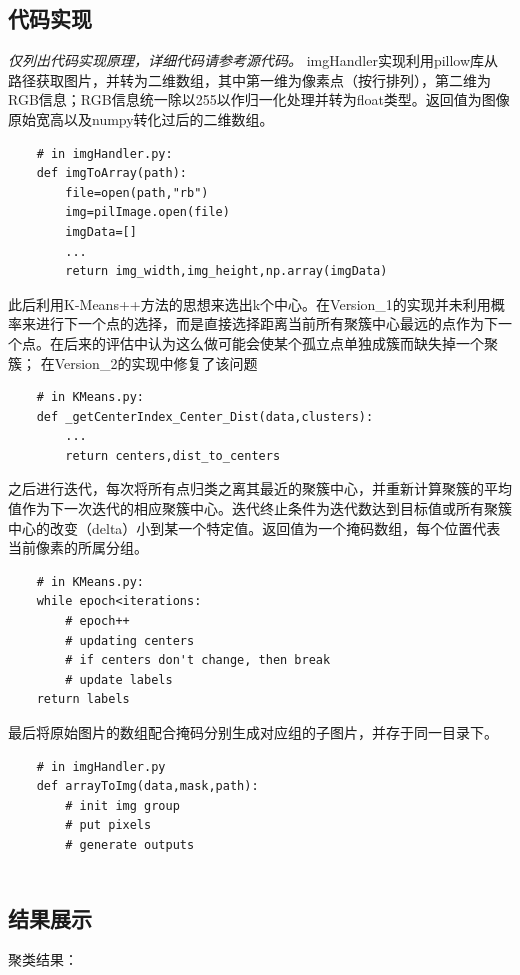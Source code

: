 \documentclass{article}
\begin{document}
\subsection{代码实现}
\textit{仅列出代码实现原理，详细代码请参考源代码。}
\lstset{
    language=python,
    frame=shadowbox,
    breaklines=true
}
imgHandler实现利用pillow库从路径获取图片，并转为二维数组，其中第一维为像素点（按行排列），第二维为RGB信息；RGB信息统一除以255以作归一化处理并转为float类型。返回值为图像原始宽高以及numpy转化过后的二维数组。
\begin{lstlisting}
    # in imgHandler.py:
    def imgToArray(path):
        file=open(path,"rb")
        img=pilImage.open(file)
        imgData=[]
        ...
        return img_width,img_height,np.array(imgData)
\end{lstlisting}
此后利用K-Means++方法的思想来选出k个中心。在Version_1的实现并未利用概率来进行下一个点的选择，而是直接选择距离当前所有聚簇中心最远的点作为下一个点。在后来的评估中认为这么做可能会使某个孤立点单独成簇而缺失掉一个聚簇；
在Version_2的实现中修复了该问题
\begin{lstlisting}
    # in KMeans.py:
    def _getCenterIndex_Center_Dist(data,clusters):
        ...
        return centers,dist_to_centers
\end{lstlisting}
之后进行迭代，每次将所有点归类之离其最近的聚簇中心，并重新计算聚簇的平均值作为下一次迭代的相应聚簇中心。迭代终止条件为迭代数达到目标值或所有聚簇中心的改变（delta）小到某一个特定值。返回值为一个掩码数组，每个位置代表当前像素的所属分组。
\begin{lstlisting}
    # in KMeans.py:
    while epoch<iterations:
        # epoch++
        # updating centers
        # if centers don't change, then break
        # update labels
    return labels
\end{lstlisting}
最后将原始图片的数组配合掩码分别生成对应组的子图片，并存于同一目录下。
\begin{lstlisting}
    # in imgHandler.py
    def arrayToImg(data,mask,path):
        # init img group
        # put pixels
        # generate outputs
    
\end{lstlisting}

\subsection{结果展示}
聚类结果：
\end{document}
